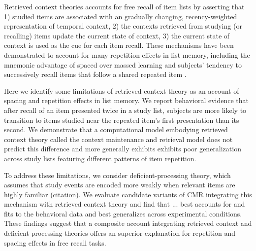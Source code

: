 Retrieved context theories accounts for free recall of item lists by asserting that 1) studied items are associated with an gradually changing, recency-weighted representation of temporal context, 2) the contexts retrieved from studying (or recalling) items update the current state of context, 3) the current state of context is used as the cue for each item recall. These mechanisms have been demonstrated to account for many repetition effects in list memory, including the mnemonic advantage of spaced over massed learning and subjects' tendency to successively recall items that follow a shared repeated item \citep{siegel2014retrieved}. 

Here we identify some limitations of retrieved context theory as an account of spacing and repetition effects in list memory. We report behavioral evidence that after recall of an item presented twice in a study list, subjects are more likely to transition to items studied near the repeated item's first presentation than its second. We demonstrate that a computational model embodying retrieved context theory called the context maintenance and retrieval model \citep[CMR;][]{polyn2009context} does not predict this difference and more generally exhibits exhibits poor generalization across study lists featuring different patterns of item repetition. 

To address these limitations, we consider deficient-processing theory, which assumes that study events are encoded more weakly when relevant items are highly familiar (citation). We evaluate candidate variants of CMR integrating this mechanism with retrieved context theory and find that ...  best accounts for and fits to the behavioral data and best generalizes across experimental conditions. These findings suggest that a composite account integrating retrieved context and deficient-processing theories offers an superior explanation for repetition and spacing effects in free recall tasks.